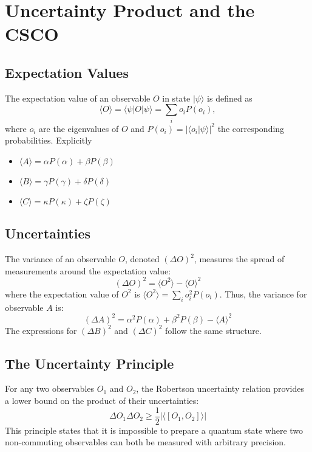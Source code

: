 \documentclass[11pt,a4paper]{article}
\begin{document}
  \section{Uncertainty Product and the CSCO}

  \subsection{Expectation Values}
  The expectation value of an observable $O$ in state $|\psi\rangle$ is defined
  as
  \[
    \langle O \rangle = \langle \psi | O | \psi \rangle = \sum_i o_i P(o_i),
  \]
  where $o_i$ are the eigenvalues of $O$ and $P(o_i) = |\langle
  o_i|\psi\rangle|^2$ the corresponding probabilities.
  Explicitly
  \begin{itemize}
    \item $\langle A \rangle = \alpha P(\alpha) + \beta P(\beta)$
    \item $\langle B \rangle = \gamma P(\gamma) + \delta P(\delta)$
    \item $\langle C \rangle = \kappa P(\kappa) + \zeta P(\zeta)$
  \end{itemize}

  \subsection{Uncertainties}
  The variance of an observable $O$, denoted $(\Delta O)^2$, measures the spread
  of measurements around the expectation value:
  \begin{equation*}
    (\Delta O)^2 = \langle O^2 \rangle - \langle O \rangle^2
  \end{equation*}
  where the expectation value of $O^2$ is $\langle O^2 \rangle = \sum_{i} o_i^2
  P(o_i)$. Thus, the variance for observable $A$ is:
  \begin{equation*}
    (\Delta A)^2 = \alpha^2 P(\alpha) + \beta^2 P(\beta) - \langle A \rangle^2
  \end{equation*}
  The expressions for $(\Delta B)^2$ and $(\Delta C)^2$ follow the same structure.

  \subsection{The Uncertainty Principle}
  For any two observables $O_1$ and $O_2$, the Robertson uncertainty relation
  provides a lower bound on the product of their uncertainties:
  \begin{equation*}
    \Delta O_1 \Delta O_2 \ge \frac{1}{2} \left| \langle [O_1, O_2] \rangle \right|
  \end{equation*}
  This principle states that it is impossible to prepare a quantum state where
  two non-commuting observables can both be measured with arbitrary precision.
\end{document}
